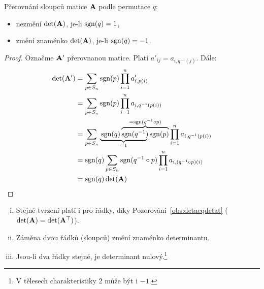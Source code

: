 \begin{observation}
    \label{obs:prerovnanisloupcu}
    Přerovnání sloupců matice $\mathbf{A}$ podle permutace $q$:
    \begin{itemize}
        \item nezmění $\det(\mathbf{A})$, je-li $\mathop{\mathrm{sgn}}(q) = 1$,
        \item změní znaménko $\det(\mathbf{A})$, je-li $\mathop{\mathrm{sgn}}(q) = -1$.
    \end{itemize}
\end{observation}

\begin{proof}
    Označme $\mathbf{A'}$ přerovnanou matice. Platí $a'_{ij} = 
    a_{i, q^{-1}(j)}.$ Dále:
    \begin{align*}
        \det(\mat{A'}) &= \sum_{p \in S_n} \sgn(p) \prod_{i=1}^n a'_{i,p(i)} \\
            &= \sum_{p \in S_n} \sgn(p) \prod_{i=1}^n a_{i, q^{-1}(p(i))} \\
            &= \sum_{p \in S_n} 
                \lefteqn{\underbrace{\phantom{\sgn(q)\sgn(q^{-1})}}_{=1}}
                \sgn(q) 
                \overbrace{\sgn(q^{-1})\sgn(p)}^{=\sgn(q^{-1} \circ p)}
                \prod_{i=1}^n a_{i, q^{-1}(p(i))} \\
            &= \sgn(q) \sum_{p \in S_n} \sgn(q^{-1} \circ p) \prod_{i=1}^n
                a_{i, (q^{-1}\circ p)(i)} \\
            &= \sgn(q)\det(\mA)
    \end{align*}
\end{proof}

\begin{remark}
    \label{rem:prerovnani}
    \leavevmode
    \begin{enumerate}[i.]
        \item Stejné tvrzení platí i pro řádky, díky 
            Pozorování~\ref{obs:detaeqdetat} ($\det(\mathbf{A}) = \det(\mathbf{A}^{\top})$).
        \item Záměna dvou řádků (sloupců) změní znaménko determinantu.
        \item Jsou-li dva řádky stejné, je determinant 
            nulový.\footnote{V tělesech charakteristiky $2$ může být i $-1$.}
    \end{enumerate}
\end{remark}

